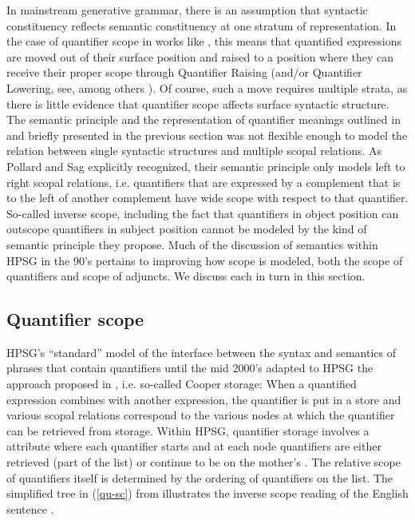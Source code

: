 \documentclass[output=paper]{langsci/langscibook}
\begin{document}
In mainstream generative grammar, there is an assumption that syntactic constituency reflects semantic constituency at one stratum of representation. In the case of quantifier scope in works like \citet{May1985}, this means that quantified expressions are moved out of their surface position and raised to a position where they can receive their proper scope through Quantifier Raising (and/or Quantifier Lowering, see, among others \citealt{Hornstein1995}). Of course, such a move requires multiple strata, as there is little evidence that quantifier scope affects surface syntactic structure. The semantic principle and the representation of quantifier meanings outlined in \citet{PollardandSag1987} and briefly presented in the previous section was not flexible enough to model the relation between single syntactic structures and multiple scopal relations. As Pollard and Sag explicitly recognized, their semantic principle only models left to right scopal relations, i.e. quantifiers that are expressed by a complement that is to the left of another complement have wide scope with respect to that quantifier. So-called inverse scope, including the fact that quantifiers in object position can outscope quantifiers in subject position cannot be modeled by the kind of semantic principle they propose. Much of the discussion of semantics within HPSG in the 90's pertains to improving how scope is modeled, both the scope of quantifiers and scope of adjuncts. We discuss each in turn in this section.


\subsection{Quantifier scope}

HPSG's ``standard'' model of the interface between the syntax and semantics of phrases that contain quantifiers until the mid 2000's adapted to HPSG the approach proposed in \citet{Cooper1975,Cooper1983}, i.e. so-called Cooper storage: When a quantified expression combines with another expression, the quantifier is put in a store and various scopal relations correspond to the various nodes at which the quantifier can be retrieved from storage. Within HPSG, quantifier storage involves a  attribute where each quantifier starts and at each node quantifiers are either retrieved (part of the  list) or continue to be on the mother's . The relative scope of quantifiers itself is determined by the ordering of quantifiers on the  list. The simplified tree in (\ref{qu-sc}) from \citet[p.324]{ps2} illustrates the inverse scope reading of the English sentence .
\end{document}
